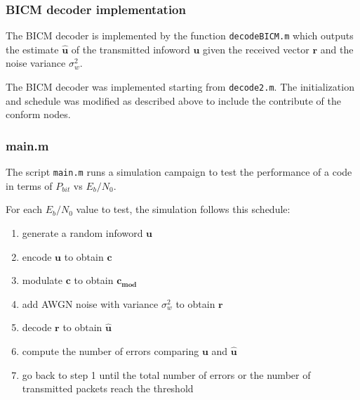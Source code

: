 \documentclass[]{beamer}
\begin{document}
\begin{frame}
\transwipe[direction=0]
\frametitle{BICM decoder implementation}
The BICM decoder is implemented by the function \texttt{decodeBICM.m} which outputs the estimate $\mathbf{\widehat u}$ of the transmitted infoword $\mathbf{u}$ given the received vector $\mathbf{r}$ and the noise variance $\sigma_w^2$. 

\vspace{0.5cm}

The BICM decoder was implemented starting from \texttt{decode2.m}. The initialization and schedule was modified as described above to include the contribute of the conform nodes.
\end{frame}

\begin{frame}
\transwipe[direction=0]
\frametitle{main.m}
The script \texttt{main.m} runs a simulation campaign to test the performance of a code in terms of $P_{bit}$ vs $E_b/N_0$.

For each $E_b/N_0$ value to test, the simulation follows this schedule:
	\begin{enumerate}
		\item generate a random infoword $\mathbf{u}$
		\item encode $\mathbf{u}$ to obtain $\mathbf{c}$
		\item modulate $\mathbf{c}$ to obtain $\mathbf{c_{mod}}$
		\item add AWGN noise with variance $\sigma_w^2$ to obtain $\mathbf{r}$
		\item decode $\mathbf{r}$ to obtain $\mathbf{\widehat u}$
		\item compute the number of errors comparing $\mathbf{u}$ and $\mathbf{\widehat u}$
		\item go back to step 1 until the total number of errors or the number of transmitted packets reach the threshold
	\end{enumerate}

\end{frame}
\end{document}
